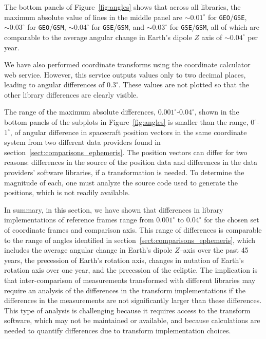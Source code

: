 \documentclass[draft]{agujournal2019}
\begin{document}
The bottom panels of Figure~\ref{fig:angles} shows that across all libraries, the maximum absolute value of lines in the middle panel are ${\sim}0.01^\circ$ for \texttt{GEO}/\texttt{GSE}, ${\sim} 0.03^\circ$ for \texttt{GEO}/\texttt{GSM}, ${\sim}0.04^\circ$ for \texttt{GSE}/\texttt{GSM}, and ${\sim}0.03^\circ$ for \texttt{GSE}/\texttt{GSM}, all of which are comparable to the average angular change in Earth's dipole $Z$ axis of ${\sim}0.04^\circ$ per year.

We have also performed coordinate transforms using the  coordinate calculator web service. However, this service outputs values only to two decimal places, leading to angular differences of $0.3^\circ$. These values are not plotted so that the other library differences are clearly visible.

The range of the maximum absolute differences, $0.001^\circ$-$0.04^\circ$, shown in the bottom panels of the subplots in Figure~\ref{fig:angles} is smaller than the range, $0^\circ$-$1^\circ$, of angular difference in spacecraft position vectors in the same coordinate system from two different data providers found in section~\ref{sect:comparisons_ephemeris}. The position vectors can differ for two reasons: differences in the source of the position data and differences in the data providers' software libraries, if a transformation is needed. To determine the magnitude of each, one must analyze the source code used to generate the positions, which is not readily available.

In summary, in this section, we have shown that differences in library implementations of reference frames range from $0.001^\circ$ to $0.04^\circ$ for the chosen set of coordinate frames and comparison axis.
This range of differences is comparable to the range of angles identified in section~\ref{sect:comparisons_ephemeris}, which includes the average angular change in Earth's dipole $Z$--axis over the past 45 years, the precession of Earth's rotation axis, changes in nutation of Earth's rotation axis over one year, and the precession of the ecliptic. The implication is that inter-comparison of measurements transformed with different libraries may require an analysis of the differences in the transform implementations if the differences in the measurements are not significantly larger than these differences. This type of analysis is challenging because it requires access to the transform software, which may not be maintained or available, and because calculations are needed to quantify differences due to transform implementation choices.
\end{document}
